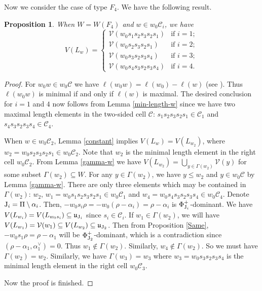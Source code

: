 \documentclass[11pt, reqno]{amsart}
\renewcommand{\subset}{\subseteq}
\newtheorem{prop}[Thm]{Proposition}
\theoremstyle{definition}
\numberwithin{equation}{section}
\begin{document}
Now we consider the case of type $F_4$. We have the following result.

\begin{prop}\label{f4av}
    When $W=W(F_4)$ and $w\in w_0\mathcal{C}_i$, we have 
    \[
V(L_w)=
\begin{cases}
\mathcal V(w_0s_1s_2s_3s_2s_1) & \text{if~}i=1;\\
\mathcal V(w_0s_2s_3s_2s_1) & \text{if~}i=2;\\
\mathcal V(w_0s_3s_2s_3s_4) & \text{if~}i=3;\\
\mathcal V(w_0s_4s_3s_2s_3s_4) & \text{if~}i=4.
\end{cases}
\]
\end{prop}
\begin{proof}
    For $w_0w\in w_0\mathcal{C}$ we have $\ell(w_0w)=\ell(w_0)-\ell(w)$ (see \cite[Cor. 2.3.3]{BB05}). Thus  $\ell(w_0w)$ is minimal if and only if  $\ell(w)$ is maximal. The desired conclusion for $i=1$ and $4$ now follows from Lemma \ref{min-length-w} since we have two maximal length elements in the two-sided cell $\mathcal{C}$: $s_1s_2s_3s_2s_1\in \mathcal{C}_1$ and $s_4s_3s_2s_3s_4\in \mathcal{C}_4$.


When $w \in w_0\mathcal{C}_2$, Lemma \ref{constant} implies $V(L_w) = V(L_{w_2})$, where  $w_2=w_0s_2s_3s_2s_1 \in w_0\mathcal{C}_2$. Note that $w_2$ is the minimal length element in  the right cell $w_0\mathcal{C}_2$. From Lemma \ref{gamma-w} we have $V(L_{w_2})=\bigcup\limits_{y\in \Gamma(w_2)}\mathcal{V}(y)$ for some subset $\Gamma(w_2)\subset W$. For any $y\in \Gamma(w_2)$, we  have $y\leq w_2$ and $y\in w_0\mathcal{C}$ by Lemma \ref{gamma-w}. There are only three elements which may be contained in $\Gamma(w_2)$: $w_2$, $w_1=w_0s_1s_2s_3s_2s_1\in w_0\mathcal{C}_1$
 and $w_4=w_0s_4s_3s_2s_3s_4\in w_0\mathcal{C}_4$. 
 Denote ${\rm J}_i=\Pi\setminus {\alpha_i}$. 
Then,  $-w_0s_i\rho=-w_0(\rho-\alpha_i)=\rho-\alpha_i$ is $\Phi_{{\rm J}_i}^+$-dominant.
We  have $V(L_{w_i})=V(L_{w_0s_i})\subset \mathfrak{u}_{{\rm J}_i}$ since $s_i\in \mathcal{C}_i$. If $w_1\in \Gamma(w_2)$,  we will have $V(L_{w_1})=\mathcal{V}(w_1)\subset V(L_{w_2})\subset \mathfrak{u}_{{\rm J}_2}$. Then from Proposition \ref{Same}, $-w_0s_1\rho=\rho-\alpha_1$ will be  $\Phi_{{\rm J}_2}^+$-dominant, which is a contradiction since $(\rho-\alpha_1,\alpha^{\vee}_1)=0$. Thus $w_1\notin \Gamma(w_2)$. Similarly, $w_4\notin \Gamma(w_2)$. So we must have $\Gamma(w_2)=w_2$. Similarly, we have $\Gamma(w_3)=w_3$ where $w_3=w_0s_3s_2s_3s_4$ is the minimal length element in the right cell $w_0\mathcal{C}_3$.

Now the proof is finished.

\end{proof}
\end{document}
